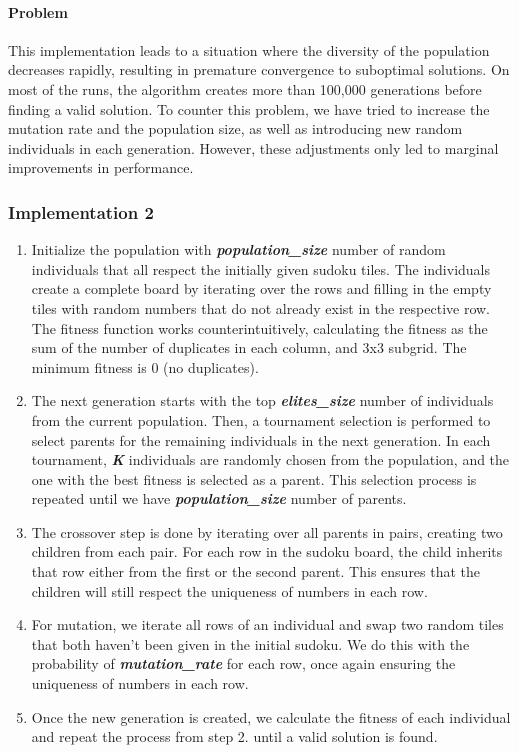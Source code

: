 \paragraph{Problem}
This implementation leads to a situation where the diversity of the population decreases rapidly, resulting in premature convergence to suboptimal solutions. On most of the runs, the algorithm creates more than 100,000 generations before finding a valid solution.  
To counter this problem, we have tried to increase the mutation rate and the population size, as well as introducing new random individuals in each generation. However, these adjustments only led to marginal improvements in performance.

\subsubsection{Implementation 2}
\begin{enumerate}
\item Initialize the population with \textit{\textbf{population\_size}} number of random individuals that all respect the initially given sudoku tiles. The individuals create a complete board by iterating over the rows and filling in the empty tiles with random numbers that do not already exist in the respective row. The fitness function works counterintuitively, calculating the fitness as the sum of the number of duplicates in each column, and 3x3 subgrid. The minimum fitness is 0 (no duplicates).
\item The next generation starts with the top \textit{\textbf{elites\_size}} number of individuals from the current population. Then, a tournament selection is performed to select parents for the remaining individuals in the next generation. In each tournament, \textit{\textbf{K}} individuals are randomly chosen from the population, and the one with the best fitness is selected as a parent. This selection process is repeated until we have \textit{\textbf{population\_size}} number of parents.
\item The crossover step is done by iterating over all parents in pairs, creating two children from each pair. For each row in the sudoku board, the child inherits that row either from the first or the second parent. This ensures that the children will still respect the uniqueness of numbers in each row.
\item For mutation, we iterate all rows of an individual and swap two random tiles that both haven't been given in the initial sudoku. We do this with the probability of \textit{\textbf{mutation\_rate}} for each row, once again ensuring the uniqueness of numbers in each row.
\item Once the new generation is created, we calculate the fitness of each individual and repeat the process from step 2. until a valid solution is found.
\end{enumerate}

